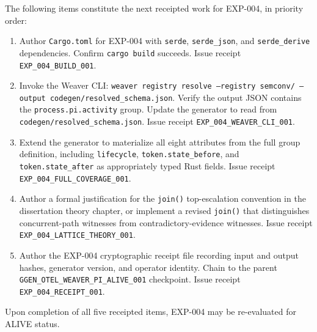 The following items constitute the next receipted work for EXP-004, in priority order:

\begin{enumerate}
  \item Author \texttt{Cargo.toml} for EXP-004 with \texttt{serde}, \texttt{serde\_json},
    and \texttt{serde\_derive} dependencies. Confirm \texttt{cargo build} succeeds. Issue
    receipt \texttt{EXP\_004\_BUILD\_001}.
  \item Invoke the Weaver CLI: \texttt{weaver registry resolve --registry semconv/ --output
    codegen/resolved\_schema.json}. Verify the output JSON contains the
    \texttt{process.pi.activity} group. Update the generator to read from
    \texttt{codegen/resolved\_schema.json}. Issue receipt \texttt{EXP\_004\_WEAVER\_CLI\_001}.
  \item Extend the generator to materialize all eight attributes from the full group
    definition, including \texttt{lifecycle}, \texttt{token.state\_before}, and
    \texttt{token.state\_after} as appropriately typed Rust fields. Issue receipt
    \texttt{EXP\_004\_FULL\_COVERAGE\_001}.
  \item Author a formal justification for the \texttt{join()} top-escalation convention
    in the dissertation theory chapter, or implement a revised \texttt{join()} that
    distinguishes concurrent-path witnesses from contradictory-evidence witnesses.
    Issue receipt \texttt{EXP\_004\_LATTICE\_THEORY\_001}.
  \item Author the EXP-004 cryptographic receipt file recording input and output hashes,
    generator version, and operator identity. Chain to the parent
    \texttt{GGEN\_OTEL\_WEAVER\_PI\_ALIVE\_001} checkpoint. Issue receipt
    \texttt{EXP\_004\_RECEIPT\_001}.
\end{enumerate}

Upon completion of all five receipted items, EXP-004 may be re-evaluated for ALIVE
status.
